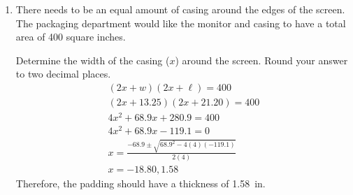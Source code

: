 \documentclass[letterpaper,12pt,fleqn]{article}
\begin{document}
\begin{enumerate}
\begin{enumerate}
  \item There needs to be an equal amount of casing around the edges of the screen.  The packaging department
    would like the monitor and casing to have a total area of 400 square inches.


    Determine the width of the casing ($x$) around the screen. Round your answer to
    two decimal places.
    \begin{gather*}
      (2x+w)(2x+\ell)=400 \\
      (2x+13.25)(2x+21.20)=400 \\
      4x^2+68.9x+280.9=400 \\
      4x^2+68.9x-119.1=0 \\
      x=\frac{-68.9\pm\sqrt{68.9^2-4(4)(-119.1)}}{2(4)} \\
      x=-18.80,1.58
    \end{gather*}
    Therefore, the padding should have a thickness of \SI{1.58}{in}.
  \end{enumerate}
\end{enumerate}
\end{document}
